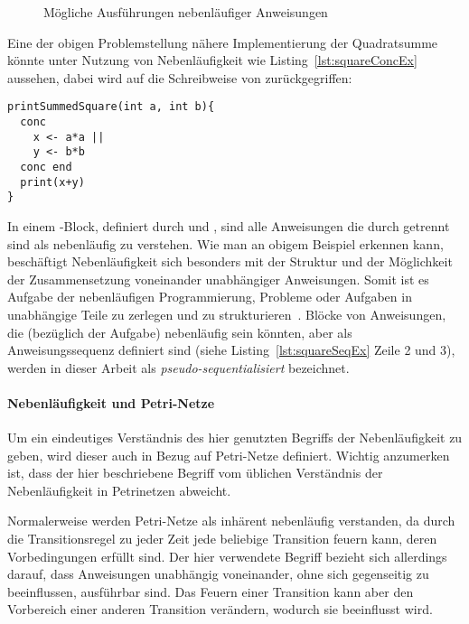 \begin{figure}[hbt]
\begin{subfigure}{\textwidth}
\begin{tikzpicture}
\end{tikzpicture}
\end{subfigure}

\caption{Mögliche Ausführungen nebenläufiger Anweisungen}\label{fig:concAnweisungen}
\end{figure}

Eine der obigen Problemstellung nähere Implementierung der Quadratsumme könnte unter Nutzung von Nebenläufigkeit wie Listing~\ref{lst:squareConcEx} aussehen, dabei wird auf die Schreibweise von \textcite[S.~16]{Herrtwich1989} zurückgegriffen:
\begin{lstlisting}[caption={Beispiel eines Programms mit nebenläufigem Code in einem \code{conc}-Block. Das Programm gibt die Summe von zwei Quadratzahlen aus, wobei die Berechnung der Quadratzahlen nebenläufig stattfindet.}, label={lst:squareConcEx}]
printSummedSquare(int a, int b){
  conc 
    x <- a*a ||
    y <- b*b
  conc end
  print(x+y)
}
\end{lstlisting}
In einem -Block, definiert durch  und , sind alle Anweisungen die durch \code{||} getrennt sind als nebenläufig zu verstehen. Wie man an obigem Beispiel erkennen kann, beschäftigt Nebenläufigkeit sich besonders mit der Struktur und der Möglichkeit der Zusammensetzung voneinander unabhängiger Anweisungen. Somit ist es Aufgabe der nebenläufigen Programmierung, Probleme oder Aufgaben in unabhängige Teile zu zerlegen und zu strukturieren~\cite{Pike2012,Hettel2016}. Blöcke von Anweisungen, die (bezüglich der Aufgabe) nebenläufig sein könnten, aber als Anweisungssequenz definiert sind (siehe Listing~\ref{lst:squareSeqEx} Zeile 2 und 3), werden in dieser Arbeit als \emph{pseudo-sequentialisiert} bezeichnet.

\paragraph{Nebenläufigkeit und Petri-Netze}
Um ein eindeutiges Verständnis des hier genutzten Begriffs der Nebenläufigkeit zu geben, wird dieser auch in Bezug auf Petri-Netze definiert. Wichtig anzumerken ist, dass der hier beschriebene Begriff vom üblichen Verständnis der Nebenläufigkeit in Petrinetzen abweicht. 

Normalerweise werden Petri-Netze  als inhärent nebenläufig verstanden, da durch die Transitionsregel zu jeder Zeit jede beliebige Transition feuern kann, deren Vorbedingungen  erfüllt sind. Der hier verwendete Begriff bezieht sich allerdings darauf, dass Anweisungen unabhängig voneinander, ohne sich gegenseitig zu beeinflussen, ausführbar sind. Das Feuern einer Transition kann aber den Vorbereich einer anderen Transition verändern, wodurch sie beeinflusst wird.


